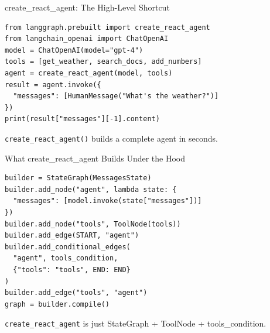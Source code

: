 \documentclass[aspectratio=169,11pt]{beamer}
\begin{document}
\begin{frame}[fragile]{create\_react\_agent: The High-Level Shortcut}
  \begin{codebox}
    \begin{lstlisting}
from langgraph.prebuilt import create_react_agent
from langchain_openai import ChatOpenAI
model = ChatOpenAI(model="gpt-4")
tools = [get_weather, search_docs, add_numbers]
agent = create_react_agent(model, tools)
result = agent.invoke({
  "messages": [HumanMessage("What's the weather?")]
})
print(result["messages"][-1].content)
    \end{lstlisting}
  \end{codebox}
  \vspace{0.1cm}
  \begin{tipbox}
    \texttt{create\_react\_agent()} builds a complete agent in seconds.
  \end{tipbox}
\end{frame}

\begin{frame}[fragile,shrink=5]{What create\_react\_agent Builds Under the Hood}
  \begin{codebox}
    \begin{lstlisting}
builder = StateGraph(MessagesState)
builder.add_node("agent", lambda state: {
  "messages": [model.invoke(state["messages"])]
})
builder.add_node("tools", ToolNode(tools))
builder.add_edge(START, "agent")
builder.add_conditional_edges(
  "agent", tools_condition,
  {"tools": "tools", END: END}
)
builder.add_edge("tools", "agent")
graph = builder.compile()
    \end{lstlisting}
  \end{codebox}
  \begin{tipbox}[Demystified]
    \texttt{create\_react\_agent} is just StateGraph + ToolNode + tools\_condition.
  \end{tipbox}
\end{frame}
\end{document}
